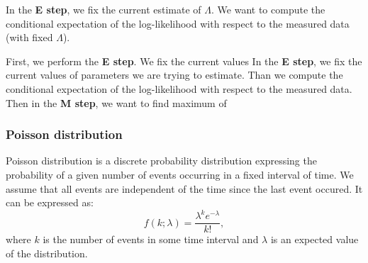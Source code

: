 In the \textbf{E step}, we fix the current estimate of $\Lambda$. 
We want to compute the conditional expectation of the log-likelihood with respect to the measured data (with fixed $\Lambda$).



First, we perform the \textbf{E step}.
We fix the current values 
In the \textbf{E step}, we fix the current values of parameters we are trying to estimate.
Than we compute the conditional expectation of the log-likelihood with respect to the measured data.
Then in the \textbf{M step}, we want to find maximum of 


\subsubsection{Poisson distribution}
Poisson distribution is a discrete probability distribution expressing the probability of a given number of events occurring in a fixed interval of time.
We assume that all events are independent of the time since the last event occured.
It can be expressed as:
\begin{equation}
  f(k;\lambda )={\frac {\lambda ^{k}e^{-\lambda }}{k!}},
\end{equation}
where $k$ is the number of events in some time interval and $\lambda$ is an expected value of the distribution.


